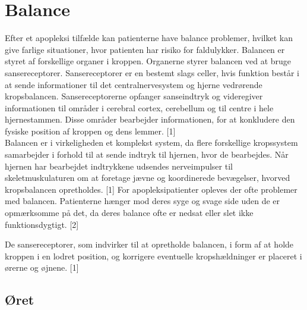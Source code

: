 \section{Balance}
Efter et apopleksi tilfælde kan patienterne have balance problemer, hvilket kan give farlige situationer, hvor patienten har risiko for faldulykker. Balancen er styret af forskellige organer i kroppen. Organerne styrer balancen ved at bruge sansereceptorer. Sansereceptorer er en bestemt slags celler, hvis funktion består i at sende informationer til det centralnervesystem og hjerne vedrørende kropsbalancen. Sansereceptorerne opfanger sanseindtryk og videregiver informationen til områder i cerebral cortex, cerebellum og til centre i hele hjernestammen. Disse områder bearbejder informationen, for at konkludere den fysiske position af kroppen og dens lemmer. [1]\\

Balancen er i virkeligheden et komplekst system, da flere forskellige kropssystem samarbejder i forhold til at sende indtryk til hjernen, hvor de bearbejdes. Når hjernen har bearbejdet indtrykkene udsendes nerveimpulser til skeletmuskulaturen om at foretage jævne og koordinerede bevægelser, hvorved kropsbalancen opretholdes. [1] For apopleksipatienter opleves der ofte problemer med balancen. Patienterne hænger mod deres syge og svage side uden de er opmærksomme på det, da deres balance ofte er nedsat eller slet ikke funktionsdygtigt. [2] 

De sansereceptorer, som indvirker til at opretholde balancen, i form af at holde kroppen i en lodret position, og korrigere eventuelle kropshældninger er placeret i ørerne og øjnene.  [1]

\subsection{Øret} 

